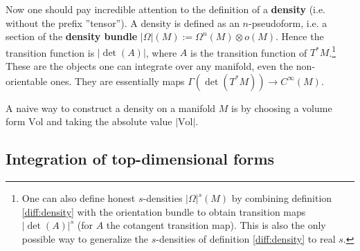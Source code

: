     \begin{remark}
        Now one should pay incredible attention to the definition of a \textbf{density} (i.e. without the prefix ''tensor''). A density is defined as an $n$-pseudoform, i.e. a section of the \textbf{density bundle} $|\Omega|(M):=\Omega^n(M)\otimes o(M)$. Hence the transition function is $|\det(A)|$, where $A$ is the transition function of $T^*M$.\footnote{One can also define honest $s$-densities $|\Omega|^s(M)$ by combining definition \ref{diff:density} with the orientation bundle to obtain transition maps $|\det(A)|^s$ (for $A$ the cotangent transition map). This is also the only possible way to generalize the $s$-densities of definition \ref{diff:density} to real $s$.}  These are the objects one can integrate over any manifold, even the non-orientable ones. They are essentially maps $\Gamma(\det(T^*M))\rightarrow C^\infty(M)$.

        A naive way to construct a density on a manifold $M$ is by choosing a volume form $\text{Vol}$ and taking the absolute value $|\text{Vol}|$.
    \end{remark}

\subsection{Integration of top-dimensional forms}



